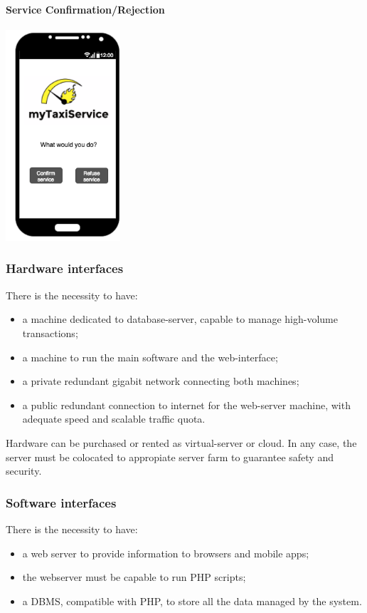 		\paragraph{Service Confirmation/Rejection}
		\begin{center}
		    \includegraphics[width=0.32\textwidth]{./images/TELEFONO7}
		\end{center}
		
		\newpage
		\subsubsection{Hardware interfaces}
			There is the necessity to have:
			\begin{itemize}
				\item a machine dedicated to database-server, capable to manage high-volume transactions;
				\item a machine to run the main software and the web-interface;
				\item a private redundant gigabit network connecting both machines;
				\item a public redundant connection to internet for the web-server machine, with adequate speed and scalable traffic quota.
			\end{itemize}
			Hardware can be purchased or rented as virtual-server or cloud. In any case, the server must be colocated to appropiate server farm to guarantee safety and security.
		\subsubsection{Software interfaces}
			There is the necessity to have:
			\begin{itemize}
				\item a web server to provide information to browsers and mobile apps;
				\item the webserver must be capable to run PHP scripts;
				\item a DBMS, compatible with PHP, to store all the data managed by the system.
			\end{itemize}
